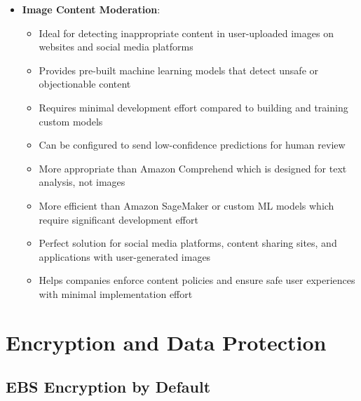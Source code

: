 \documentclass[11pt,a4paper]{report}
\begin{document}
\begin{itemize}
\begin{itemize}
\begin{itemize}
  \item Most operationally efficient solution for extracting and identifying PHI in healthcare documents
  \item More efficient than using custom Python libraries for text extraction and PHI identification
  \item More straightforward than using SageMaker to build custom ML models for PHI detection
  \item More appropriate than Amazon Rekognition which is designed for image analysis, not document text processing
\end{itemize}
\end{itemize}
  \item \textbf{Image Content Moderation}:
\begin{itemize}
  \item Ideal for detecting inappropriate content in user-uploaded images on websites and social media platforms
  \item Provides pre-built machine learning models that detect unsafe or objectionable content
  \item Requires minimal development effort compared to building and training custom models
  \item Can be configured to send low-confidence predictions for human review
  \item More appropriate than Amazon Comprehend which is designed for text analysis, not images
  \item More efficient than Amazon SageMaker or custom ML models which require significant development effort
  \item Perfect solution for social media platforms, content sharing sites, and applications with user-generated images
  \item Helps companies enforce content policies and ensure safe user experiences with minimal implementation effort
\end{itemize}
\end{itemize}


\chapter{Encryption and Data Protection}



\section{EBS Encryption by Default}
\end{document}
